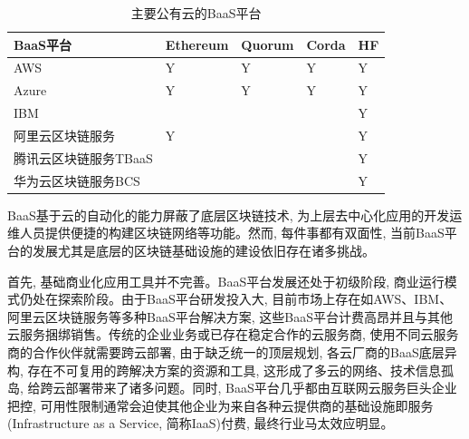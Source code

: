 {\footnotesize
\begin{longtable}[h]{m{100pt} m{50pt} m{50pt} m{50pt} m{50pt}}
    \caption[主要公有云的BaaS平台]{主要公有云的BaaS平台} \label{major_BaaS_platforms} \\
        \toprule  
        \textbf{BaaS平台}&\textbf{Ethereum}&\textbf{Quorum}&\textbf{Corda}&\textbf{HF}\\
        \hline
        
        AWS&Y&Y&Y&Y\\

        Azure&Y&Y&Y&Y\\

        IBM& & & &Y\\

        阿里云区块链服务&Y& & &Y\\

        腾讯云区块链服务TBaaS& & & &Y\\

        华为云区块链服务BCS& & & &Y\\
        \bottomrule
    \end{longtable}
}



BaaS基于云的自动化的能力屏蔽了底层区块链技术, 为上层去中心化应用的开发运维人员提供便捷的构建区块链网络等功能。然而, 每件事都有双面性, 当前BaaS平台的发展尤其是底层的区块链基础设施的建设依旧存在诸多挑战。

首先, 基础商业化应用工具并不完善\footnotemark[1]。BaaS平台发展还处于初级阶段, 商业运行模式仍处在探索阶段。由于BaaS平台研发投入大, 目前市场上存在如AWS、IBM、阿里云区块链服务等多种BaaS平台解决方案, 这些BaaS平台计费高昂\footnotemark[2]并且与其他云服务捆绑销售。传统的企业业务或已存在稳定合作的云服务商, 使用不同云服务商的合作伙伴就需要跨云部署, 由于缺乏统一的顶层规划, 各云厂商的BaaS底层异构, 存在不可复用的跨解决方案的资源和工具, 这形成了多云的网络\cite{DBLP:conf/coins/GerritsKKFV21}、技术信息孤岛, 给跨云部署带来了诸多问题。同时, BaaS平台几乎都由互联网云服务巨头企业把控, 可用性限制通常会迫使其他企业为来自各种云提供商的基础设施即服务(Infrastructure as a Service, 简称IaaS)付费, 最终行业马太效应明显\cite{KuernetesbasedFabricChaincodeManagementAndHihgAvailabilityTechnology}。

